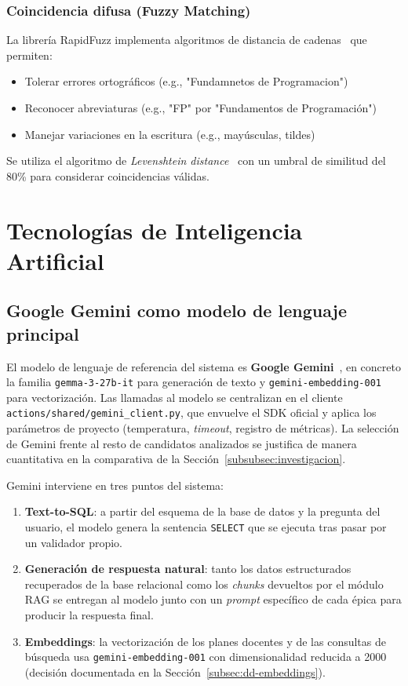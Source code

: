\subsubsection{Coincidencia difusa (Fuzzy Matching)}

La librería RapidFuzz implementa algoritmos de distancia de cadenas~\cite{cohen2003comparison} que permiten:

\begin{itemize}
    \item Tolerar errores ortográficos (e.g., "Fundamnetos de Programacion")
    \item Reconocer abreviaturas (e.g., "FP" por "Fundamentos de Programación")
    \item Manejar variaciones en la escritura (e.g., mayúsculas, tildes)
\end{itemize}

Se utiliza el algoritmo de \textit{Levenshtein distance}~\cite{levenshtein1966binary} con un umbral de similitud del 80\% para considerar coincidencias válidas.

\section{Tecnologías de Inteligencia Artificial}\label{sec:ia}

\subsection{Google Gemini como modelo de lenguaje principal}

El modelo de lenguaje de referencia del sistema es \textbf{Google Gemini}~\cite{geminidocs}, en concreto la familia \texttt{gemma-3-27b-it} para generación de texto y \texttt{gemini-embedding-001} para vectorización. Las llamadas al modelo se centralizan en el cliente \texttt{actions/shared/gemini\_client.py}, que envuelve el SDK oficial y aplica los parámetros de proyecto (temperatura, \textit{timeout}, registro de métricas). La selección de Gemini frente al resto de candidatos analizados se justifica de manera cuantitativa en la comparativa de la Sección~\ref{subsubsec:investigacion}.

Gemini interviene en tres puntos del sistema:

\begin{enumerate}
    \item \textbf{Text-to-SQL}: a partir del esquema de la base de datos y la pregunta del usuario, el modelo genera la sentencia \texttt{SELECT} que se ejecuta tras pasar por un validador propio.
    \item \textbf{Generación de respuesta natural}: tanto los datos estructurados recuperados de la base relacional como los \textit{chunks} devueltos por el módulo RAG se entregan al modelo junto con un \textit{prompt} específico de cada épica para producir la respuesta final.
    \item \textbf{Embeddings}: la vectorización de los planes docentes y de las consultas de búsqueda usa \texttt{gemini-embedding-001} con dimensionalidad reducida a 2000 (decisión documentada en la Sección~\ref{subsec:dd-embeddings}).
\end{enumerate}

